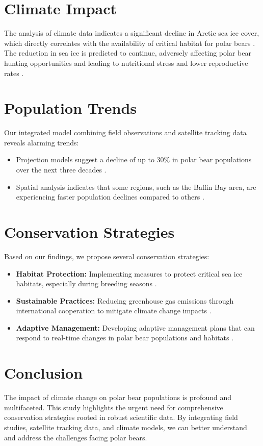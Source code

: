 \documentclass[12pt]{article}
\begin{document}
\section{Climate Impact}

The analysis of climate data indicates a significant decline in Arctic sea ice cover, which directly correlates with the availability of critical habitat for polar bears \cite{Meier2014}. The reduction in sea ice is predicted to continue, adversely affecting polar bear hunting opportunities and leading to nutritional stress and lower reproductive rates \cite{Amstrup2010}.

\section{Population Trends}

Our integrated model combining field observations and satellite tracking data reveals alarming trends:
\begin{itemize}
    \item Projection models suggest a decline of up to 30\% in polar bear populations over the next three decades \cite{Obbard2016}.
    \item Spatial analysis indicates that some regions, such as the Baffin Bay area, are experiencing faster population declines compared to others \cite{Peacock2013}.
\end{itemize}

\section{Conservation Strategies}

Based on our findings, we propose several conservation strategies:
\begin{itemize}
    \item \textbf{Habitat Protection:} Implementing measures to protect critical sea ice habitats, especially during breeding seasons \cite{Durner2009}.
    \item \textbf{Sustainable Practices:} Reducing greenhouse gas emissions through international cooperation to mitigate climate change impacts \cite{Aars2006}.
    \item \textbf{Adaptive Management:} Developing adaptive management plans that can respond to real-time changes in polar bear populations and habitats \cite{Hunter2010}.
\end{itemize}

\section{Conclusion}

The impact of climate change on polar bear populations is profound and multifaceted. This study highlights the urgent need for comprehensive conservation strategies rooted in robust scientific data. By integrating field studies, satellite tracking data, and climate models, we can better understand and address the challenges facing polar bears.



\end{document}

